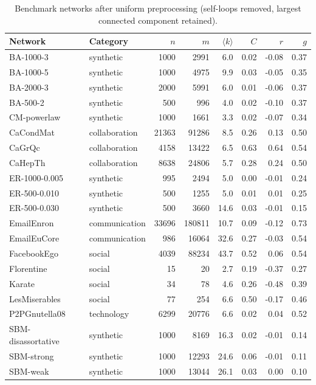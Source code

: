 \begin{table}[htbp]
\centering
\footnotesize
\caption{Benchmark networks after uniform preprocessing (self-loops removed, largest connected component retained).}
\label{tab:benchmark}
\begin{tabular}{l l r r r r r r}
\toprule
Network & Category & $n$ & $m$ & $\langle k\rangle$ & $C$ & $r$ & $g$ \\
\midrule
BA-1000-3 & synthetic & 1000 & 2991 & 6.0 & 0.02 & -0.08 & 0.37 \\
BA-1000-5 & synthetic & 1000 & 4975 & 9.9 & 0.03 & -0.05 & 0.35 \\
BA-2000-3 & synthetic & 2000 & 5991 & 6.0 & 0.01 & -0.06 & 0.37 \\
BA-500-2 & synthetic & 500 & 996 & 4.0 & 0.02 & -0.10 & 0.37 \\
CM-powerlaw & synthetic & 1000 & 1661 & 3.3 & 0.02 & -0.07 & 0.34 \\
CaCondMat & collaboration & 21363 & 91286 & 8.5 & 0.26 & 0.13 & 0.50 \\
CaGrQc & collaboration & 4158 & 13422 & 6.5 & 0.63 & 0.64 & 0.54 \\
CaHepTh & collaboration & 8638 & 24806 & 5.7 & 0.28 & 0.24 & 0.50 \\
ER-1000-0.005 & synthetic & 995 & 2494 & 5.0 & 0.00 & -0.01 & 0.24 \\
ER-500-0.010 & synthetic & 500 & 1255 & 5.0 & 0.01 & 0.01 & 0.25 \\
ER-500-0.030 & synthetic & 500 & 3660 & 14.6 & 0.03 & -0.01 & 0.15 \\
EmailEnron & communication & 33696 & 180811 & 10.7 & 0.09 & -0.12 & 0.73 \\
EmailEuCore & communication & 986 & 16064 & 32.6 & 0.27 & -0.03 & 0.54 \\
FacebookEgo & social & 4039 & 88234 & 43.7 & 0.52 & 0.06 & 0.54 \\
Florentine & social & 15 & 20 & 2.7 & 0.19 & -0.37 & 0.27 \\
Karate & social & 34 & 78 & 4.6 & 0.26 & -0.48 & 0.39 \\
LesMiserables & social & 77 & 254 & 6.6 & 0.50 & -0.17 & 0.46 \\
P2PGnutella08 & technology & 6299 & 20776 & 6.6 & 0.02 & 0.04 & 0.52 \\
SBM-disassortative & synthetic & 1000 & 8169 & 16.3 & 0.02 & -0.01 & 0.14 \\
SBM-strong & synthetic & 1000 & 12293 & 24.6 & 0.06 & -0.01 & 0.11 \\
SBM-weak & synthetic & 1000 & 13044 & 26.1 & 0.03 & 0.00 & 0.10 \\

\end{tabular}
\end{table}

